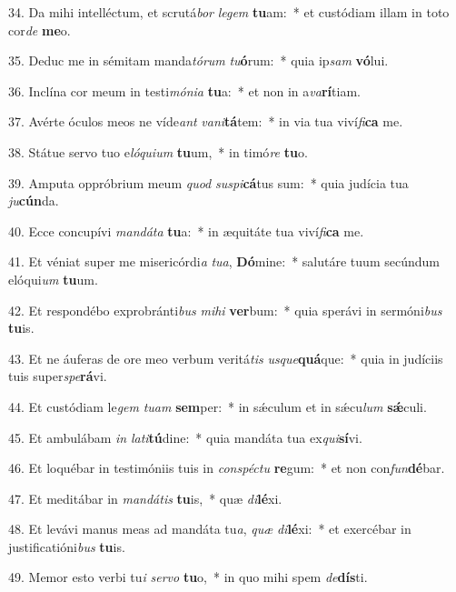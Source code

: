 34. Da mihi intelléctum, et scrutá\textit{bor} \textit{le}\textit{gem} \textbf{tu}am:~*  et custódiam illam in toto cor\textit{de} \textbf{me}o.\

35. Deduc me in sémitam manda\textit{tó}\textit{rum} \textit{tu}\textbf{ó}rum:~*  quia ip\textit{sam} \textbf{vó}lui.\

36. Inclína cor meum in testi\textit{mó}\textit{ni}\textit{a} \textbf{tu}a:~*  et non in a\textit{va}\textbf{rí}tiam.\

37. Avérte óculos meos ne víde\textit{ant} \textit{va}\textit{ni}\textbf{tá}tem:~*  in via tua viví\textit{fi}\textbf{ca} me.\

38. Státue servo tuo e\textit{ló}\textit{qui}\textit{um} \textbf{tu}um,~*  in timó\textit{re} \textbf{tu}o.\

39. Amputa oppróbrium meum \textit{quod} \textit{su}\textit{spi}\textbf{cá}tus sum:~*  quia judícia tua \textit{ju}\textbf{cún}da.\

40. Ecce concupívi \textit{man}\textit{dá}\textit{ta} \textbf{tu}a:~*  in æquitáte tua viví\textit{fi}\textbf{ca} me.\

41. Et véniat super me misericórdi\textit{a} \textit{tu}\textit{a}, \textbf{Dó}mine:~*  salutáre tuum secúndum elóqui\textit{um} \textbf{tu}um.\

42. Et respondébo exprobránti\textit{bus} \textit{mi}\textit{hi} \textbf{ver}bum:~*  quia sperávi in sermóni\textit{bus} \textbf{tu}is.\

43. Et ne áuferas de ore meo verbum veritá\textit{tis} \textit{us}\textit{que}\textbf{quá}que:~*  quia in judíciis tuis super\textit{spe}\textbf{rá}vi.\

44. Et custódiam le\textit{gem} \textit{tu}\textit{am} \textbf{sem}per:~*  in sǽculum et in sǽcu\textit{lum} \textbf{sǽ}culi.\

45. Et ambulábam \textit{in} \textit{la}\textit{ti}\textbf{tú}dine:~*  quia mandáta tua ex\textit{qui}\textbf{sí}vi.\

46. Et loquébar in testimóniis tuis in \textit{con}\textit{spéc}\textit{tu} \textbf{re}gum:~*  et non con\textit{fun}\textbf{dé}bar.\

47. Et meditábar in \textit{man}\textit{dá}\textit{tis} \textbf{tu}is,~*  quæ \textit{di}\textbf{lé}xi.\

48. Et levávi manus meas ad mandáta tu\textit{a}, \textit{quæ} \textit{di}\textbf{lé}xi:~*  et exercébar in justificatióni\textit{bus} \textbf{tu}is.\

49. Memor esto verbi tu\textit{i} \textit{ser}\textit{vo} \textbf{tu}o,~*  in quo mihi spem \textit{de}\textbf{dís}ti.\

